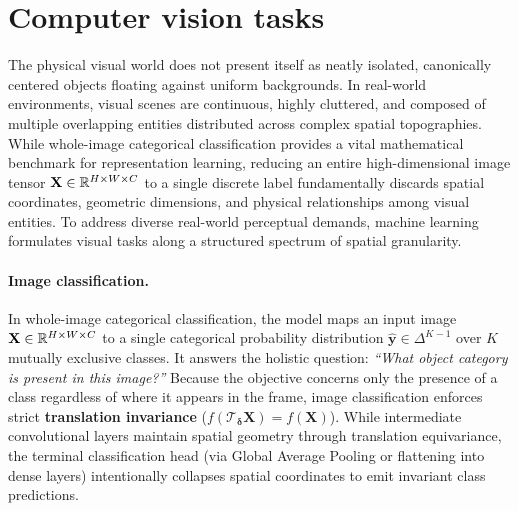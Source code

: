 \section{Computer vision tasks}
\label{sec:downstream_cv_tasks_imagenet}

The physical visual world does not present itself as neatly isolated, canonically centered objects floating against uniform backgrounds. In real-world environments, visual scenes are continuous, highly cluttered, and composed of multiple overlapping entities distributed across complex spatial topographies. While whole-image categorical classification provides a vital mathematical benchmark for representation learning, reducing an entire high-dimensional image tensor $\mathbf{X} \in \mathbb{R}^{H \times W \times C}$ to a single discrete label fundamentally discards spatial coordinates, geometric dimensions, and physical relationships among visual entities. To address diverse real-world perceptual demands, machine learning formulates visual tasks along a structured spectrum of spatial granularity.

\paragraph{Image classification.}
In whole-image categorical classification, the model maps an input image $\mathbf{X} \in \mathbb{R}^{H \times W \times C}$ to a single categorical probability distribution $\hat{\mathbf{y}} \in \Delta^{K-1}$ over $K$ mutually exclusive classes. It answers the holistic question: \textit{``What object category is present in this image?''} Because the objective concerns only the presence of a class regardless of where it appears in the frame, image classification enforces strict \textbf{translation invariance} ($f(\mathcal{T}_{\boldsymbol{\delta}}\mathbf{X}) = f(\mathbf{X})$). While intermediate convolutional layers maintain spatial geometry through translation equivariance, the terminal classification head (via Global Average Pooling or flattening into dense layers) intentionally collapses spatial coordinates to emit invariant class predictions.


